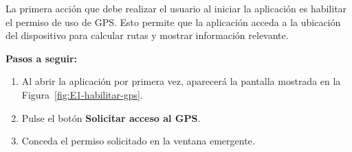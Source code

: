 \noindent
\begin{minipage}{0.45\textwidth}
\end{minipage}
\hfill
\begin{minipage}{0.5\textwidth}
	La primera acción que debe realizar el usuario al iniciar la aplicación es habilitar el permiso de uso de GPS. Esto permite que la aplicación acceda a la ubicación del dispositivo para calcular rutas y mostrar información relevante.
	
	\textbf{Pasos a seguir:}
	\begin{enumerate}
		\item Al abrir la aplicación por primera vez, aparecerá la pantalla mostrada en la Figura~\ref{fig:E1-habilitar-gps}.
		\item Pulse el botón \textbf{Solicitar acceso al GPS}.
		\item Conceda el permiso solicitado en la ventana emergente.
	\end{enumerate}
\end{minipage}


